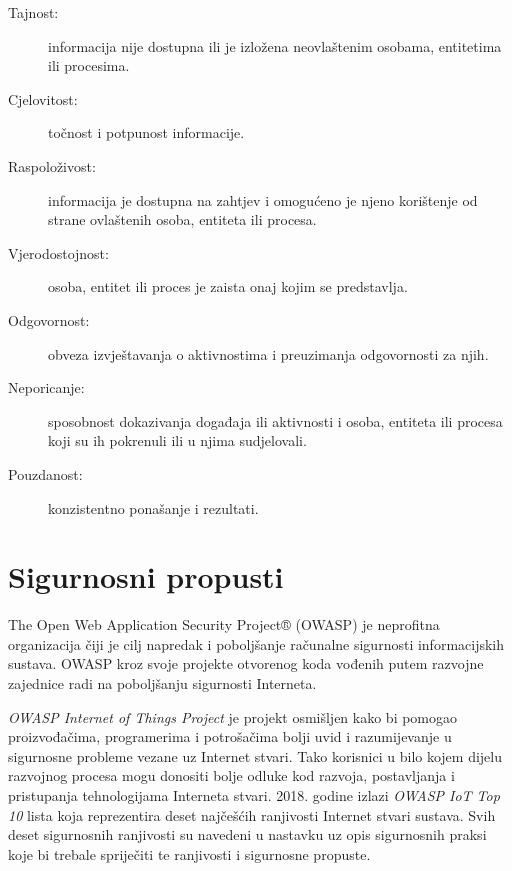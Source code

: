 \documentclass[times, utf8, diplomski]{fer}
\begin{document}
\begin{description}
    \item[Tajnost:]informacija nije dostupna ili je izložena  neovlaštenim osobama, entitetima ili procesima.
    \item[Cjelovitost:]točnost i potpunost informacije.
    \item[Raspoloživost:]informacija je dostupna na zahtjev i omogućeno je njeno korištenje od strane ovlaštenih osoba, entiteta ili procesa.
    \item[Vjerodostojnost:]osoba, entitet ili proces je zaista onaj kojim se predstavlja.
    \item[Odgovornost:]obveza izvještavanja o aktivnostima i preuzimanja odgovornosti za njih.
    \item[Neporicanje:]sposobnost dokazivanja događaja ili aktivnosti i osoba, entiteta ili procesa koji su ih pokrenuli ili u njima sudjelovali.
    \item[Pouzdanost:]konzistentno ponašanje i rezultati.
\end{description}

\section{Sigurnosni propusti}
The Open Web Application Security Project® (OWASP) je neprofitna organizacija čiji je cilj napredak i poboljšanje računalne sigurnosti informacijskih sustava. OWASP kroz svoje projekte otvorenog koda vođenih putem razvojne zajednice radi na poboljšanju sigurnosti Interneta.

\emph{OWASP Internet of Things Project} je projekt osmišljen kako bi pomogao proizvođačima, programerima i potrošačima bolji uvid i razumijevanje u sigurnosne probleme vezane uz Internet stvari. Tako korisnici u bilo kojem dijelu razvojnog procesa mogu donositi bolje odluke kod razvoja, postavljanja i pristupanja tehnologijama Interneta stvari\citep{owasp1}. 2018. godine izlazi \emph{OWASP IoT Top 10} lista koja reprezentira deset najčešćih ranjivosti Internet stvari sustava. Svih deset sigurnosnih ranjivosti su navedeni u nastavku uz opis sigurnosnih praksi koje bi trebale spriječiti te ranjivosti i sigurnosne propuste. 
\end{document}
